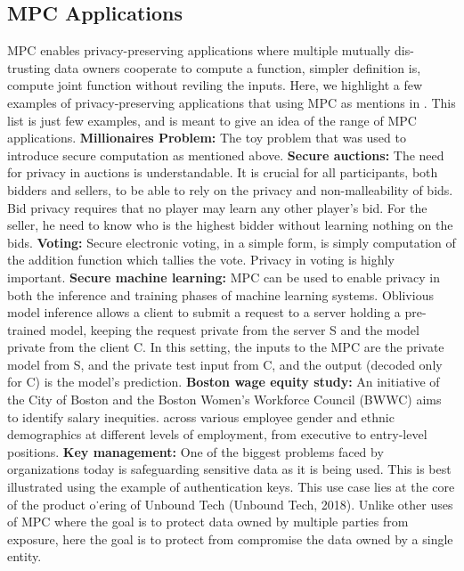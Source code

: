 \documentclass[12pt]{article}
\begin{document}
\subsection{MPC Applications}
MPC enables privacy-preserving applications where multiple mutually dis-trusting data owners cooperate to compute a function, simpler definition is, compute joint function without reviling the inputs. Here, we highlight a few examples of privacy-preserving applications that using MPC as mentions in \cite{MPC_applications}. This list is just few examples, and is meant to give an idea of the range of MPC applications.
\hfill\break\hfill\break
\textbf{Millionaires Problem:} The toy problem that was used to introduce secure computation as mentioned above. \hfill\break\hfill\break
\textbf{Secure auctions:} The need for privacy in auctions is understandable. It is crucial for all participants, both bidders and sellers, to be able to rely on the privacy and non-malleability of bids. Bid privacy requires that no player may learn any other player’s bid. For the seller, he need to know who is the highest bidder without learning nothing on the bids. \hfill\break\hfill\break
\textbf{Voting:} Secure electronic voting, in a simple form, is simply computation of the addition function which tallies the vote. Privacy in voting is highly important. \hfill\break\hfill\break
\textbf{Secure machine learning:} MPC can be used to enable privacy in both the inference and training phases of machine learning systems.
Oblivious model inference allows a client to submit a request to a server holding a pre-trained model, keeping the request private from the server S and the model private from the client C. In this setting, the inputs to the MPC are the private model from S, and the private test input from C, and the output (decoded only for C) is the model’s prediction.\hfill\break\hfill\break
\textbf{Boston wage equity study:} An initiative of the City of Boston and the Boston Women’s Workforce Council (BWWC) aims to identify salary inequities. across various employee gender and ethnic demographics at different levels of employment, from executive to entry-level positions.\hfill\break\hfill\break
\textbf{Key management:} One of the biggest problems faced by organizations today is safeguarding sensitive data as it is being used. This is best illustrated using the example of authentication keys. This use case lies at the core of the product o˙ering of Unbound Tech (Unbound Tech, 2018). Unlike other uses of MPC where the goal is to protect data owned by multiple parties from exposure, here the goal is to protect from compromise the data owned by a single entity.
\end{document}
